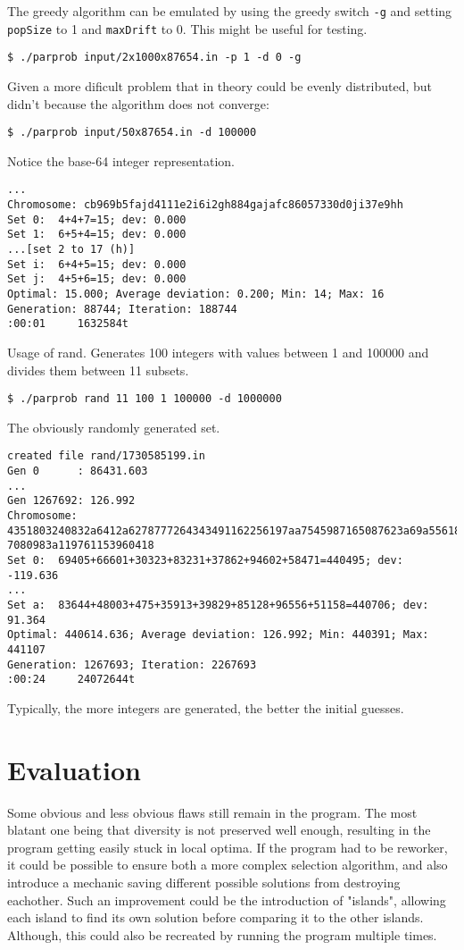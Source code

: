 \documentclass[a4paper,10pt]{article}
\begin{document}
\newline
The greedy algorithm can be emulated by using the greedy switch {\tt -g} and setting {\tt popSize} to 1 and {\tt maxDrift} to 0. This might be useful for testing.
\begin{lstlisting}[style = stdio]
$ ./parprob input/2x1000x87654.in -p 1 -d 0 -g
\end{lstlisting}
Given a more dificult problem that in theory could be evenly distributed, but didn't because the algorithm does not converge:
\begin{lstlisting}[style = stdio]
$ ./parprob input/50x87654.in -d 100000
\end{lstlisting}
Notice the base-64 integer representation.
\begin{lstlisting}[style = stdio]
...
Chromosome: cb969b5fajd4111e2i6i2gh884gajafc86057330d0ji37e9hh
Set 0:  4+4+7=15; dev: 0.000
Set 1:  6+5+4=15; dev: 0.000
...[set 2 to 17 (h)]
Set i:  6+4+5=15; dev: 0.000
Set j:  4+5+6=15; dev: 0.000
Optimal: 15.000; Average deviation: 0.200; Min: 14; Max: 16
Generation: 88744; Iteration: 188744
:00:01     1632584t
\end{lstlisting}
Usage of rand. Generates 100 integers with values between 1 and 100000 and divides them between 11 subsets.
\begin{lstlisting}[style = stdio]
$ ./parprob rand 11 100 1 100000 -d 1000000
\end{lstlisting}
The obviously randomly generated set.
\begin{lstlisting}[style = stdio]
created file rand/1730585199.in
Gen 0      : 86431.603
...
Gen 1267692: 126.992
Chromosome: 4351803240832a6412a6278777264343491162256197aa7545987165087623a69a5561869a059
7080983a119761153960418
Set 0:  69405+66601+30323+83231+37862+94602+58471=440495; dev: -119.636
...
Set a:  83644+48003+475+35913+39829+85128+96556+51158=440706; dev: 91.364
Optimal: 440614.636; Average deviation: 126.992; Min: 440391; Max: 441107
Generation: 1267693; Iteration: 2267693
:00:24     24072644t\end{lstlisting}
Typically, the more integers are generated, the better the initial guesses.
\section{Evaluation}
Some obvious and less obvious flaws still remain in the program.
The most blatant one being that diversity is not preserved well enough, resulting in the program getting easily stuck in local optima.
If the program had to be reworker, it could be possible to ensure both a more complex selection algorithm, and also introduce a mechanic saving different possible solutions from destroying eachother.
Such an improvement could be the introduction of "islands", allowing each island to find its own solution before comparing it to the other islands.
Although, this could also be recreated by running the program multiple times.
\end{document}
